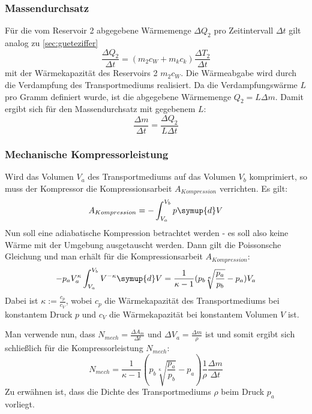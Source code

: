 \subsubsection {Massendurchsatz}
\label{sec:massendurchsatz}
Für die vom Reservoir 2 abgegebene Wärmemenge $\Delta Q_2$ pro Zeitintervall $\Delta t$ gilt analog zu \ref{sec:gueteziffer}
\begin{equation}
	\frac{\Delta Q_2}{\Delta t} = (m_2 c_W + m_k c_k) \frac{\Delta T_2}{\Delta t}
\end{equation}
mit der Wärmekapazität des Reservoirs 2 $m_2 c_W$.
Die Wärmeabgabe wird durch die Verdampfung des Transportmediums realisiert.
Da die Verdampfungswärme $L$ pro Gramm definiert wurde, ist die abgegebene Wärmemenge $Q_2 = L \Delta m$. Damit ergibt sich für den Massendurchsatz mit gegebenem $L$:
\begin{equation}
	\label{eqn:massendurchsatz}
	\frac{\Delta m}{\Delta t} = \frac{\Delta Q_2}{L \Delta t}
\end{equation}



\subsubsection {Mechanische Kompressorleistung} 
\label{sec:kompressorleistung}
Wird das Volumen $V_a$ des Transportmediums auf das Volumen $V_b$ komprimiert, so muss der Kompressor die Kompressionsarbeit $A_{Kompression}$ verrichten. Es gilt:
\begin{equation}
	A_{Kompression} = -\int_{V_a}^{V_b} p \symup{d}V
\end{equation}
Nun soll eine adiabatische Kompression betrachtet werden - es soll also keine Wärme mit der Umgebung ausgetauscht werden.
Dann gilt die Poissonsche Gleichung und man erhält für die Kompressionsarbeit $A_{Kompression}$:
\begin{equation}
	-p_a V_a^{\kappa} \int_{V_a}^{V_b} V^{-\kappa} \symup{d}V = \frac{1}{\kappa - 1} (p_b \sqrt[\kappa]{\frac{p_a}{p_b}} - p_a) V_a
\end{equation}
Dabei ist $\kappa := \frac{c_p}{c_V}$, wobei $c_p$ die Wärmekapazität des Transportmediums bei konstantem Druck $p$ und $c_V$ die Wärmekapazität bei konstantem Volumen $V$ ist.

Man verwende nun, dass $N_{mech} = \frac{\Delta A_m}{\Delta t}$ und $\Delta V_a = \frac{\Delta m}{\rho}$ ist und somit ergibt sich schließlich für die Kompressorleistung $N_{mech}$:
\begin{equation}
	\label{eqn:kompressorleistung}
	N_{mech} = \frac{1}{\kappa - 1} (p_b \sqrt[\kappa]{\frac{p_a}{p_b}} - p_a) \frac{1}{\rho} \frac{\Delta m}{\Delta t}
\end{equation}
Zu erwähnen ist, dass die Dichte des Transportmediums $\rho$ beim Druck $p_a$ vorliegt.

